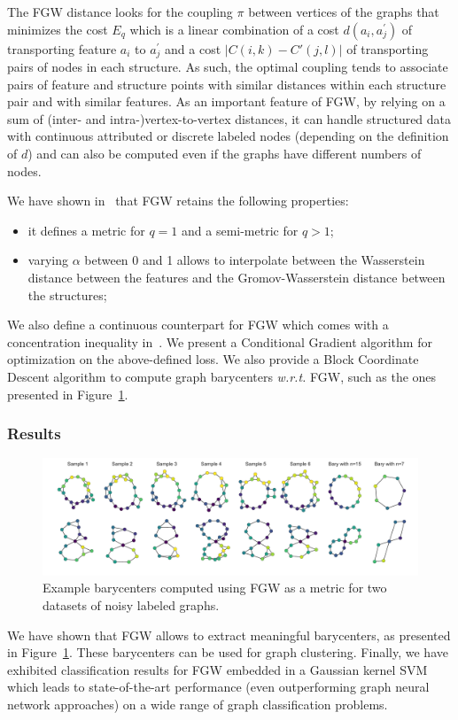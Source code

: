 The FGW distance looks for the coupling $\pi$ between vertices of the
graphs that minimizes the cost $E_{q}$ which is a linear combination of a cost
$d(a_{i},a^\prime_j)$ of transporting feature $a_{i}$ to $a^\prime_j$
and a cost $|C(i,k)-C'(j,l)|$ of transporting pairs of nodes in each structure.
As such, the optimal coupling tends to associate pairs of feature and
structure points with similar distances within each structure pair and with
similar features.
As an important feature of FGW, by relying on a sum of
(inter- and intra-)vertex-to-vertex distances, it can handle structured data
with continuous attributed or discrete labeled nodes
(depending on the definition of $d$) and can also be computed even if the graphs
have different numbers of nodes.

We have shown in~\cite{vayer:hal-02174322} that FGW retains the following
properties:

\begin{itemize}
\item it defines a metric for $q=1$ and a semi-metric for $q >1$;
\item varying $\alpha$ between 0 and 1 allows to interpolate between the
Wasserstein distance between the features and the Gromov-Wasserstein distance
between the structures;
\end{itemize}

We also define a continuous counterpart for FGW which comes with a
concentration inequality in~\cite{vayer:hal-02174316}.
We present a Conditional Gradient algorithm for optimization on the
above-defined loss.
We also provide a Block Coordinate Descent algorithm to compute graph
barycenters \emph{w.r.t.} FGW, such as the ones presented in
Figure~\ref{fig:bary_fgw}.

\subsubsection{Results}

\begin{figure}
\centering
\includegraphics[width=\textwidth]{fig/fgw_bary}
\caption{Example barycenters computed using FGW as a metric for two datasets of
noisy labeled graphs. \label{fig:bary_fgw}}
\end{figure}

We have shown that FGW allows to extract meaningful barycenters, as presented
in Figure~\ref{fig:bary_fgw}.
These barycenters can be used for graph clustering.
Finally, we have exhibited classification results for FGW embedded in a
Gaussian kernel SVM which leads to state-of-the-art performance
(even outperforming graph
neural network approaches) on a wide range of graph classification problems.
